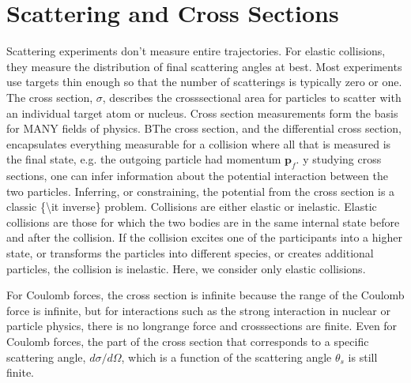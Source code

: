 \documentclass[letterpaper,10pt,english]{sphinxmanual}
\begin{document}
\section{Scattering and Cross Sections}
\label{\detokenize{chapter1:scattering-and-cross-sections}}
Scattering experiments don’t measure entire trajectories. For elastic
collisions, they measure the distribution of final scattering angles
at best. Most experiments use targets thin enough so that the number
of scatterings is typically zero or one. The cross section, \(\sigma\),
describes the cross\sphinxhyphen{}sectional area for particles to scatter with an
individual target atom or nucleus. Cross section measurements form the
basis for MANY fields of physics. BThe cross section, and the
differential cross section, encapsulates everything measurable for a
collision where all that is measured is the final state, e.g. the
outgoing particle had momentum \(\boldsymbol{p}_f\). y studying cross sections,
one can infer information about the potential interaction between the
two particles. Inferring, or constraining, the potential from the
cross section is a classic \{\textbackslash{}it inverse\} problem. Collisions are
either elastic or inelastic. Elastic collisions are those for which
the two bodies are in the same internal state before and after the
collision. If the collision excites one of the participants into a
higher state, or transforms the particles into different species, or
creates additional particles, the collision is inelastic. Here, we
consider only elastic collisions.

For Coulomb forces, the cross section is infinite because the range of
the Coulomb force is infinite, but for interactions such as the strong
interaction in nuclear or particle physics, there is no long\sphinxhyphen{}range
force and cross\sphinxhyphen{}sections are finite. Even for Coulomb forces, the part
of the cross section that corresponds to a specific scattering angle,
\(d\sigma/d\Omega\), which is a function of the scattering angle
\(\theta_s\) is still finite.
\end{document}
